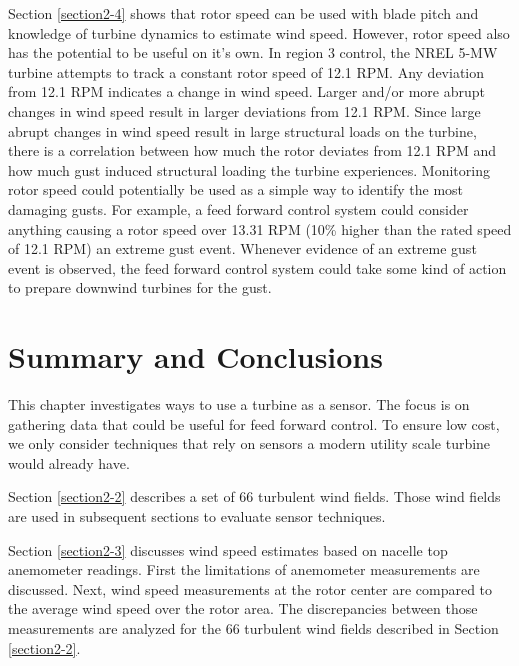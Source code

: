 Section \ref{section2-4} shows that rotor speed can be used with blade pitch and knowledge of turbine dynamics to estimate wind speed. However, rotor speed also has the potential to be useful on it's own. In region 3 control, the NREL 5-MW turbine attempts to track a constant rotor speed of 12.1 RPM. Any deviation from 12.1 RPM indicates a change in wind speed. Larger and/or more abrupt changes in wind speed result in larger deviations from 12.1 RPM. Since large abrupt changes in wind speed result in large structural loads on the turbine, there is a correlation between how much the rotor deviates from 12.1 RPM and how much gust induced structural loading the turbine experiences. Monitoring rotor speed could potentially be used as a simple way to identify the most damaging gusts. For example, a feed forward control system could consider anything causing a rotor speed over 13.31 RPM (10\% higher than the rated speed of 12.1 RPM) an extreme gust event. Whenever evidence of an extreme gust event is observed, the feed forward control system could take some kind of action to prepare downwind turbines for the gust.


\section{Summary and Conclusions} \label{section2-7}

This chapter investigates ways to use a turbine as a sensor. The focus is on gathering data that could be useful for feed forward control. To ensure low cost, we only consider techniques that rely on sensors a modern utility scale turbine would already have.

Section \ref{section2-2} describes a set of 66 turbulent wind fields. Those wind fields are used in subsequent sections to evaluate sensor techniques. 

Section \ref{section2-3} discusses wind speed estimates based on nacelle top anemometer readings. First the limitations of anemometer measurements are discussed. Next, wind speed measurements at the rotor center are compared to the average wind speed over the rotor area. The discrepancies between those measurements are analyzed for the 66 turbulent wind fields described in Section \ref{section2-2}.
 
